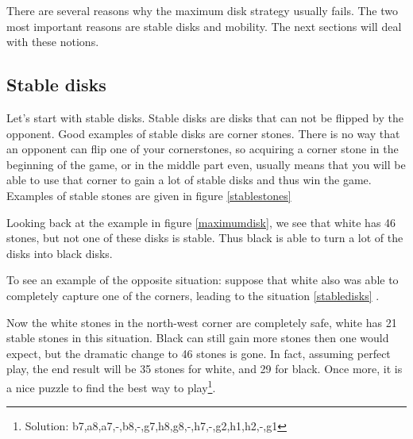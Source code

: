 \documentclass[12pt,twoside]{report}
\begin{document}
There are several reasons why the maximum disk strategy usually fails. The two most
important reasons are stable disks and mobility. The next sections will deal with these
notions.
\subsection{Stable disks}
Let's start with stable disks. Stable disks are disks that can not
be flipped by the opponent. Good examples of stable disks are
corner stones. There is no way that an opponent can flip one of
your cornerstones, so acquiring a corner stone in the beginning of
the game, or in the middle part even, usually means that you will
be able to use that corner to gain a lot of stable disks and thus
win the game. Examples of stable stones are given in figure \ref{stablestones}

\begin{figure}[h]
\stablestones
\end{figure}

Looking back at the example in figure \ref{maximumdisk}, we see that
white has 46 stones, but not one of these disks is stable. Thus black is able to turn a lot of
the disks into black disks.

To see an example of the opposite situation: suppose that white also was able to completely
capture one of the corners, leading to the situation \ref{stabledisks} .
\begin{figure}[ht]
\stabledisks
\end{figure}
Now the white stones in the north-west corner are completely safe,
white has 21 stable stones in this situation. Black can still gain
more stones then one would expect, but the dramatic change to 46
stones is gone. In fact, assuming perfect play, the end result
will be 35 stones for white, and 29 for black. Once more, it is a
nice puzzle to find the best way to play\footnote{Solution:
b7,a8,a7,-,b8,-,g7,h8,g8,-,h7,-,g2,h1,h2,-,g1}.
\end{document}
